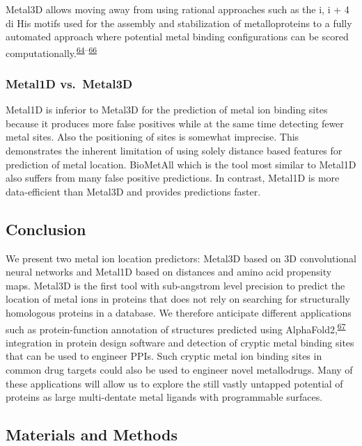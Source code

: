 \documentclass[ lineno,
  9pt]{elife}
\begin{document}
Metal3D allows moving away from using rational approaches such as the i, i + 4 di His motifs used for the assembly and stabilization of metalloproteins to a fully automated approach where potential metal binding configurations can be scored computationally.\textsuperscript{\protect\hyperlink{ref-RJ44nj3R}{64}--\protect\hyperlink{ref-85PeY3aG}{66}}

\hypertarget{metal1d-vs.-metal3d}{%
\subsubsection{Metal1D vs.~Metal3D}\label{metal1d-vs.-metal3d}}

Metal1D is inferior to Metal3D for the prediction of metal ion binding sites because it produces more false positives while at the same time detecting fewer metal sites. Also the positioning of sites is somewhat imprecise. This demonstrates the inherent limitation of using solely distance based features for prediction of metal location. BioMetAll which is the tool most similar to Metal1D also suffers from many false positive predictions. In contrast, Metal1D is more data-efficient than Metal3D and provides predictions faster.

\hypertarget{conclusion}{%
\subsection{Conclusion}\label{conclusion}}

We present two metal ion location predictors: Metal3D based on 3D convolutional neural networks and Metal1D based on distances and amino acid propensity maps. Metal3D is the first tool with sub-angstrom level precision to predict the location of metal ions in proteins that does not rely on searching for structurally homologous proteins in a database. We therefore anticipate different applications such as protein-function annotation of structures predicted using AlphaFold2,\textsuperscript{\protect\hyperlink{ref-10bYywzs6}{67}} integration in protein design software and detection of cryptic metal binding sites that can be used to engineer PPIs. Such cryptic metal ion binding sites in common drug targets could also be used to engineer novel metallodrugs. Many of these applications will allow us to explore the still vastly untapped potential of proteins as large multi-dentate metal ligands with programmable surfaces.

\hypertarget{materials-and-methods}{%
\subsection{Materials and Methods}\label{materials-and-methods}}
\end{document}
